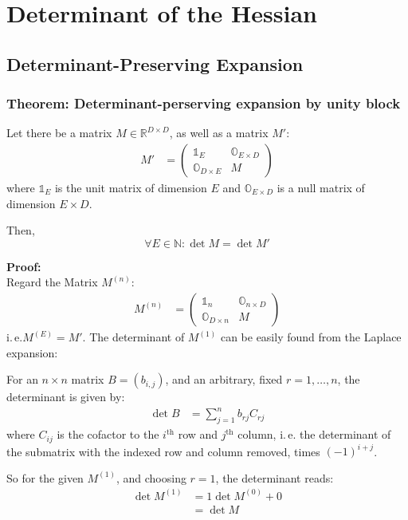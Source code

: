 \documentclass[
	english,
	a4paper,
	fontsize=10pt,
	parskip=half,
	titlepage=true,
	DIV=12,
	final
]{scrreprt}
\newcommand*{\ie}{i.\,e.\xspace}
\newcommand*{\setNaturals} {\ensuremath{\mathbb{N}}}
\newcommand*{\setReals}    {\ensuremath{\mathbb{R}}}
\begin{document}
\section{Determinant of the Hessian}
\subsection{Determinant-Preserving Expansion}
\subsubsection{Theorem: Determinant-perserving expansion by unity block}
Let there be a matrix $M \in \setReals^{D \times D}$, as well as a matrix $M'$:
\begin{align}
	M'
&=
	\begin{pmatrix}
		\mathds{1}_{E} & \mathds{O}_{E \times D} \\
		\mathds{O}_{D \times E} & M
	\end{pmatrix}
\end{align}
where $\mathds{1}_{E}$ is the unit matrix of dimension $E$ and $\mathds{O}_{E \times D}$ is a null matrix of dimension $E \times D$.

Then,
\begin{equation}
	\forall E \in \setNaturals : \det M = \det M'
\end{equation}

\textbf{Proof:}\\
Regard the Matrix $M^{(n)}$:
\begin{align}
	M^{(n)}
&=
	\begin{pmatrix}
		\mathds{1}_{n} & \mathds{O}_{n \times D} \\
		\mathds{O}_{D \times n} & M
	\end{pmatrix}
\end{align}
\ie $M^{(E)} = M'$. The determinant of $M^{(1)}$ can be easily found from the Laplace expansion:

For an $n \times n$ matrix $B = (b_{i,j})$, and an arbitrary, fixed $r = 1, \ldots, n$, the determinant is given by:
\begin{align}
	\det B
&=
	\sum_{j=1}^{n}
		b_{rj} C_{rj}
\end{align}
where $C_{ij}$ is the cofactor to the $i^{\text{th}}$ row and $j^{\text{th}}$ column, \ie the determinant of the submatrix with the indexed row and column removed, times $(-1)^{i+j}$.

So for the given $M^{(1)}$, and choosing $r = 1$, the determinant reads:
\begin{align}
	\det M^{(1)}
&=
	1 \det M^{(0)} + 0 \\
&=
	\det M
\end{align}
\end{document}
